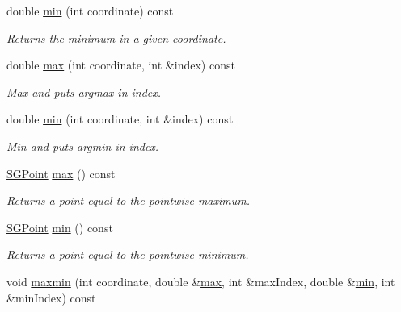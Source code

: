 \begin{DoxyCompactItemize}
\mbox{\label{classSGTuple_a1bc61069148ec787fc3fdc442020608d}} 
double \hyperlink{classSGTuple_a1bc61069148ec787fc3fdc442020608d}{min} (int coordinate) const
\begin{DoxyCompactList}\small\item\em Returns the minimum in a given coordinate. \end{DoxyCompactList}\item 
\mbox{\label{classSGTuple_a7cd93167a4d83dba5f909edca37c9b89}} 
double \hyperlink{classSGTuple_a7cd93167a4d83dba5f909edca37c9b89}{max} (int coordinate, int \&index) const
\begin{DoxyCompactList}\small\item\em Max and puts argmax in index. \end{DoxyCompactList}\item 
\mbox{\label{classSGTuple_acfce1db3f9e968e3f1a4de6443d386d7}} 
double \hyperlink{classSGTuple_acfce1db3f9e968e3f1a4de6443d386d7}{min} (int coordinate, int \&index) const
\begin{DoxyCompactList}\small\item\em Min and puts argmin in index. \end{DoxyCompactList}\item 
\mbox{\label{classSGTuple_ad81b7a615d86b6568bf95997312c4e71}} 
\hyperlink{classSGPoint}{S\+G\+Point} \hyperlink{classSGTuple_ad81b7a615d86b6568bf95997312c4e71}{max} () const
\begin{DoxyCompactList}\small\item\em Returns a point equal to the pointwise maximum. \end{DoxyCompactList}\item 
\mbox{\label{classSGTuple_ab06f15a8ad718857750661a752fb0bb7}} 
\hyperlink{classSGPoint}{S\+G\+Point} \hyperlink{classSGTuple_ab06f15a8ad718857750661a752fb0bb7}{min} () const
\begin{DoxyCompactList}\small\item\em Returns a point equal to the pointwise minimum. \end{DoxyCompactList}\item 
void \hyperlink{classSGTuple_aa57ae522bea33db282722a1e2a33bd0d}{maxmin} (int coordinate, double \&\hyperlink{classSGTuple_ad041fb90000ce1031b75d0487a4eff9b}{max}, int \&max\+Index, double \&\hyperlink{classSGTuple_a1bc61069148ec787fc3fdc442020608d}{min}, int \&min\+Index) const

\end{DoxyCompactItemize}
